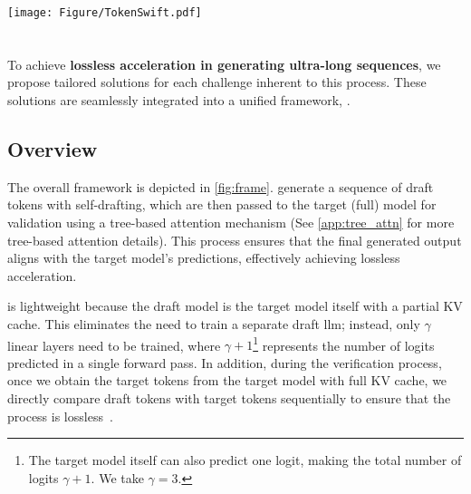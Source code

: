 \begin{figure*}[t!]
    \centering
    \texttt{[image: Figure/TokenSwift.pdf]}
    \caption{\textbf{Illustration of \ours Framework.} First, target model (LLM) with partial KV cache and three linear layers outputs 4 logits in a single forward pass. Tree-based attention is then applied to construct candidate tokens. Secondly, top-$k$ candidate $4$-grams are retrieved accordingly. These candidates compose draft tokens, which are fed into the LLM with full KV cache to generate target tokens. The verification is performed by checking if draft tokens match exactly with target tokens (\cref{alg:algorithm}). Finally, we randomly select one of the longest valid draft tokens, and update $n$-gram table and KV cache accordingly.}
    \label{fig:frame}
\end{figure*}

\section{\ours}
\label{sec:method}
To achieve \textbf{lossless acceleration in generating ultra-long sequences}, we propose tailored solutions for each challenge inherent to this process. These solutions are seamlessly integrated into a unified framework, \ie \ours.

\subsection{Overview}
\label{sec:overall}
The overall framework is depicted in \cref{fig:frame}. \ours 
generate a sequence of draft tokens with self-drafting, which are then passed to the target (full) model for validation using a tree-based attention mechanism (See \cref{app:tree_attn} for more tree-based attention details). This process ensures that the final generated output aligns with the target model’s predictions, effectively achieving lossless acceleration.

\ours is lightweight because the draft model is the target model itself with a partial KV cache. This eliminates the need to train a separate draft \ac{llm}; instead, only $\gamma$ linear layers need to be trained, where $\gamma + 1$\footnote{The target model itself can also predict one logit, making the total number of logits $\gamma+1$. We take $\gamma=3$.} represents the number of logits predicted in a single forward pass. In addition, during the verification process, once we obtain the target tokens from the target model with full KV cache, we directly compare draft tokens with target tokens sequentially to ensure that the process is lossless~\citep{rest}.

